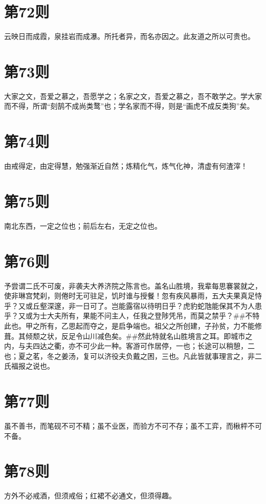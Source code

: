 \documentclass[12pt,a4paper]{ctexbook}
\begin{document}
\section{第72则}
云映日而成霞，泉挂岩而成瀑。所托者异，而名亦因之。此友道之所以可贵也。\par

\section{第73则}
大家之文，吾爱之慕之，吾愿学之；名家之文，吾爱之慕之，吾不敢学之。学大家而不得，所谓“刻鹄不成尚类鹜”也；学名家而不得，则是“画虎不成反类狗”矣。\par

\section{第74则}
由戒得定，由定得慧，勉强渐近自然；炼精化气，炼气化神，清虚有何渣滓！\par

\section{第75则}
南北东西，一定之位也；前后左右，无定之位也。\par

\section{第76则}
予尝谓二氏不可废，非袭夫大养济院之陈言也。盖名山胜境，我辈每思褰裳就之，使非琳宫梵刹，则倦时无可驻足，饥时谁与授餐！忽有疾风暴雨，五大夫果真足恃乎？又或丘壑深邃，非一日可了。岂能露宿以待明日乎？虎豹蛇虺能保其不为人患乎？又或为士大夫所有，果能不问主人，任我之登陟凭吊，而莫之禁乎？\#\#不特此也。甲之所有，乙思起而夺之，是启争端也。祖父之所创建，子孙贫，力不能修葺。其倾颓之状，反足令山川减色矣。\#\#然此特就名山胜境言之耳。即城市之内，与夫四达之衢，亦不可少此一种。客游可作居停，一也；长途可以稍憩，二也；夏之茗，冬之姜汤，复可以济役夫负戴之困，三也。凡此皆就事理言之，非二氏福报之说也。\par

\section{第77则}
虽不善书，而笔砚不可不精；虽不业医，而验方不可不存；虽不工弈，而楸枰不可不备。\par

\section{第78则}
方外不必戒酒，但须戒俗；红裙不必通文，但须得趣。\par
\end{document}
